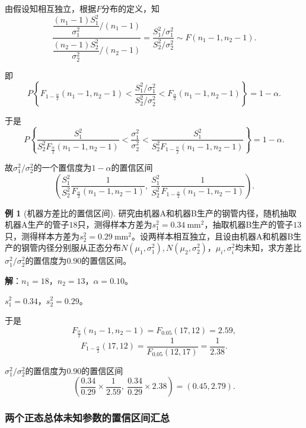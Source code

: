 \documentclass[11pt,a4paper]{report}
\theoremstyle{definition}
\newtheorem{example}{例}[chapter]
\begin{document}
由假设知相互独立，根据$F$分布的定义，知
\[
\frac{\dfrac{(n_{1}-1)S_{1}^{2}}{\sigma_{1}^{2}}\Big/(n_{1}-1)}{\dfrac{(n_{2}-1)S_{2}^{2}}{\sigma_{2}^{2}}\Big/(n_{2}-1)}=\frac{S_{1}^{2}/\sigma_{1}^{2}}{S_{2}^{2}/\sigma_{2}^{2}}\sim F(n_{1}-1,n_{2}-1).
\]

即
\[
P\left\{F_{1-\frac{\alpha}{2}}(n_{1}-1,n_{2}-1)<\frac{S_{1}^{2}/\sigma_{1}^{2}}{S_{2}^{2}/\sigma_{2}^{2}}<F_{\frac{\alpha}{2}}(n_{1}-1,n_{2}-1)\right\}=1-\alpha.
\]

于是
\[
P\left\{\frac{S_{1}^{2}}{S_{2}^{2}F_{\frac{\alpha}{2}}(n_{1}-1,n_{2}-1)}<\frac{\sigma_{1}^{2}}{\sigma_{2}^{2}}<\frac{S_{1}^{2}}{S_{2}^{2}F_{1-\frac{\alpha}{2}}(n_{1}-1,n_{2}-1)}\right\}=1-\alpha.
\]

故$\sigma_{1}^{2}/\sigma_{2}^{2}$的一个置信度为$1-\alpha$的置信区间
\[
\left(\frac{S_{1}^{2}}{S_{2}^{2}}\frac{1}{F_{\frac{\alpha}{2}}(n_{1}-1,n_{2}-1)},\ \frac{S_{1}^{2}}{S_{2}^{2}}\frac{1}{F_{1-\frac{\alpha}{2}}(n_{1}-1,n_{2}-1)}\right).
\]

\begin{example}[机器方差比的置信区间]
研究由机器A和机器B生产的钢管内径，随机抽取机器A生产的管子$18$只，测得样本方差为$s_{1}^{2}=0.34\ \text{mm}^{2}$，抽取机器B生产的管子$13$只，测得样本方差为$s_{2}^{2}=0.29\ \text{mm}^{2}$。设两样本相互独立，且设由机器A和机器B生产的钢管内径分别服从正态分布$N(\mu_{1},\sigma_{1}^{2}),N(\mu_{2},\sigma_{2}^{2})$，$\mu_{i},\sigma_{i}^{2}$均未知，求方差比$\sigma_{1}^{2}/\sigma_{2}^{2}$的置信度为$0.90$的置信区间。

\textbf{解}：$n_{1}=18$，$n_{2}=13$，$\alpha=0.10$。

$s_{1}^{2}=0.34$，$s_{2}^{2}=0.29$。

于是
\[
F_{\frac{\alpha}{2}}(n_{1}-1,n_{2}-1)=F_{0.05}(17,12)=2.59,
\]
\[
F_{1-\frac{\alpha}{2}}(17,12)=\frac{1}{F_{0.05}(12,17)}=\frac{1}{2.38}.
\]

$\sigma_{1}^{2}/\sigma_{2}^{2}$的置信度为$0.90$的置信区间
\[
\left(\frac{0.34}{0.29}\times\frac{1}{2.59},\ \frac{0.34}{0.29}\times2.38\right)=(0.45,2.79).
\]
\end{example}

\subsubsection*{两个正态总体未知参数的置信区间汇总}
\end{document}
